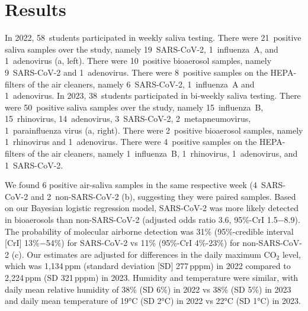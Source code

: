 \documentclass[fleqn,11pt]{wlscirep}
\begin{document}
\section*{Results}

In 2022, 58~students participated in weekly saliva testing. There were 21~positive saliva samples over the study, namely 19~SARS-CoV-2, 1~influenza~A, and 1~adenovirus (a, left). There were 10~positive bioaerosol samples, namely 9~SARS-CoV-2 and 1~adenovirus. There were 8~positive samples on the HEPA-filters of the air cleaners, namely 6~SARS-CoV-2, 1~influenza~A and 1~adenovirus. In 2023, 38~students participated in bi-weekly saliva testing. There were 50~positive saliva samples over the study, namely 15~influenza~B, 15~rhinovirus, 14~adenovirus, 3~SARS-CoV-2, 2~metapneumovirus, 1~parainfluenza virus (a, right). There were 2~positive bioaerosol samples, namely 1~rhinovirus and 1~adenovirus. There were 4~positive samples on the HEPA-filters of the air cleaners, namely 1~influenza~B, 1~rhinovirus, 1~adenovirus, and 1~SARS-CoV-2. 

We found 6 positive air-saliva samples in the same respective week (4~SARS-CoV-2 and 2~non-SARS-CoV-2 (b), suggesting they were paired samples. Based on our Bayesian logistic regression model, SARS-CoV-2 was more likely detected in bioaerosols than non-SARS-CoV-2 (adjusted odds ratio 3.6, 95\%-CrI 1.5$-$8.9). The probability of molecular airborne detection was 31\% (95\%-credible interval [CrI] 13\%$-$54\%) for SARS-CoV-2 vs 11\% (95\%-CrI 4\%-23\%) for non-SARS-CoV-2 (c). Our estimates are adjusted for differences in the daily maximum CO$_2$ level, which was 1,134\,ppm (standard deviation [SD] 277\,pppm) in 2022 compared to 2,224\,ppm (SD 321\,pppm) in 2023. Humidity and temperature were similar, with daily mean relative humidity of 38\% (SD 6\%) in 2022 vs 38\% (SD 5\%) in 2023 and daily mean temperature of 19°C (SD 2°C) in 2022 vs 22°C (SD 1°C) in 2023. 
\end{document}
